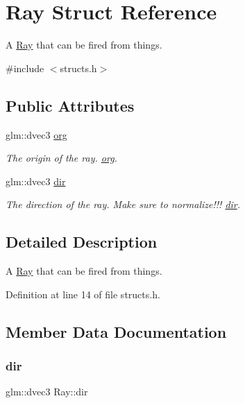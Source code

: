 \hypertarget{struct_ray}{}\section{Ray Struct Reference}
\label{struct_ray}


A \mbox{\hyperlink{struct_ray}{Ray}} that can be fired from things.  




{\ttfamily \#include $<$structs.\+h$>$}

\subsection*{Public Attributes}
\begin{DoxyCompactItemize}
\item 
glm\+::dvec3 \mbox{\hyperlink{struct_ray_a78a1cbfb1bd302b4c1790fbe41845d31}{org}}
\begin{DoxyCompactList}\small\item\em The origin of the ray. \mbox{\hyperlink{struct_ray_a78a1cbfb1bd302b4c1790fbe41845d31}{org}}. \end{DoxyCompactList}\item 
glm\+::dvec3 \mbox{\hyperlink{struct_ray_a80a47e5925e6f8d150e6ade067590520}{dir}}
\begin{DoxyCompactList}\small\item\em The direction of the ray. Make sure to normalize!!! \mbox{\hyperlink{struct_ray_a80a47e5925e6f8d150e6ade067590520}{dir}}. \end{DoxyCompactList}\end{DoxyCompactItemize}


\subsection{Detailed Description}
A \mbox{\hyperlink{struct_ray}{Ray}} that can be fired from things. 

Definition at line 14 of file structs.\+h.



\subsection{Member Data Documentation}
\mbox{\label{struct_ray_a80a47e5925e6f8d150e6ade067590520}} 
\subsubsection{\texorpdfstring{dir}{dir}}
{\footnotesize\ttfamily glm\+::dvec3 Ray\+::dir}



